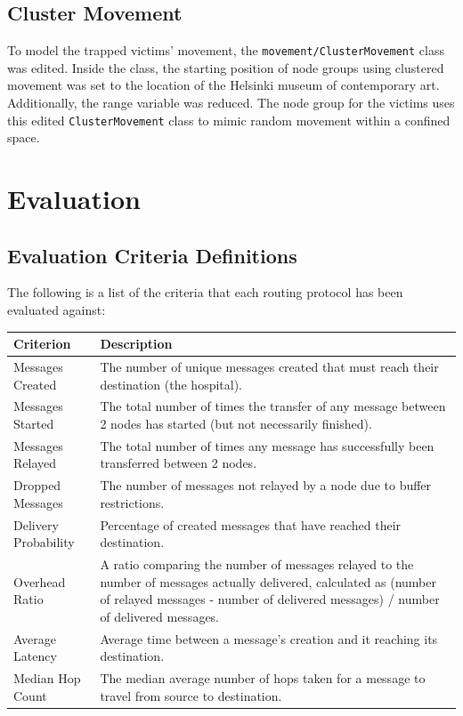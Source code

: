 \documentclass{article}
\begin{document}
\subsection{Cluster Movement}
To model the trapped victims' movement, the \texttt{movement/ClusterMovement} class was edited. Inside the class, the starting position of node groups using clustered movement was set to the location of the Helsinki museum of contemporary art. Additionally, the range variable was reduced. The node group for the victims uses this edited \texttt{ClusterMovement} class to mimic random movement within a confined space.

\section{Evaluation}
\subsection{Evaluation Criteria Definitions}
The following is a list of the criteria that each routing protocol has been evaluated against:

\begin{center}
\begin{tabular}{|l|p{13cm}|}
\hline
\textbf{Criterion} & \textbf{Description} \\ \hline
Messages Created & The number of unique messages created that must reach their destination (the hospital). \\ \hline
Messages Started & The total number of times the transfer of any message between 2 nodes has started (but not necessarily finished). \\ \hline
Messages Relayed & The total number of times any message has successfully been transferred between 2 nodes. \\ \hline
Dropped Messages & The number of messages not relayed by a node due to buffer restrictions. \\ \hline
Delivery Probability & Percentage of created messages that have reached their destination. \\ \hline
Overhead Ratio & A ratio comparing the number of messages relayed to the number of messages actually delivered, calculated as (number of relayed messages - number of delivered messages) / number of delivered messages. \\ \hline
Average Latency & Average time between a message's creation and it reaching its destination. \\ \hline
Median Hop Count & The median average number of hops taken for a message to travel from source to destination. \\ \hline
\end{tabular}
\end{center}
\end{document}
